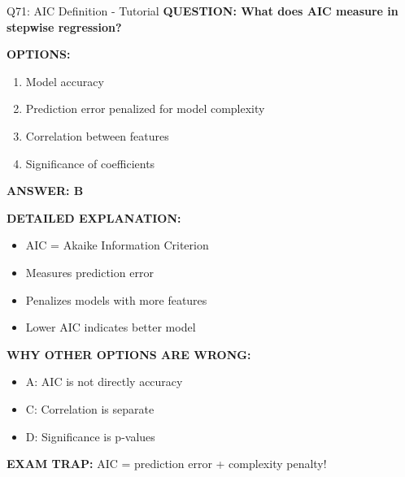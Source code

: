 \documentclass[8pt]{beamer}
\begin{document}
	\begin{frame}{Q71: AIC Definition - Tutorial}
		\fontsize{6.5}{7.5}\selectfont
		\textbf{QUESTION: What does AIC measure in stepwise regression?}
		
		\vspace{0.1cm}
		\textbf{OPTIONS:}
		\begin{enumerate}
			\item Model accuracy
			\item Prediction error penalized for model complexity
			\item Correlation between features
			\item Significance of coefficients
		\end{enumerate}
		
		\vspace{0.1cm}
		\textcolor{myblue}{\textbf{ANSWER: B}}
		
		\vspace{0.1cm}
		\textbf{DETAILED EXPLANATION:}
		\begin{itemize}
			\item AIC = Akaike Information Criterion
			\item Measures prediction error
			\item Penalizes models with more features
			\item Lower AIC indicates better model
		\end{itemize}
		
		\vspace{0.1cm}
		\textcolor{myred}{\textbf{WHY OTHER OPTIONS ARE WRONG:}}
		\begin{itemize}
			\item \textcolor{myred}{A:} AIC is not directly accuracy
			\item \textcolor{myred}{C:} Correlation is separate
			\item \textcolor{myred}{D:} Significance is p-values
		\end{itemize}
		
		\textcolor{myred}{\textbf{EXAM TRAP:}} AIC = \textcolor{myblue}{prediction error + complexity penalty}!
	\end{frame}
	
\end{document}
